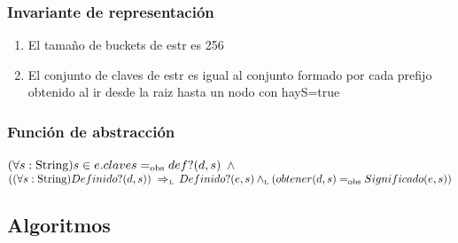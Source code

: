 
\subsubsection*{Invariante de representación}

\begin{enumerate}
\item El tamaño de buckets de estr es 256
\item El conjunto de claves de estr es igual al conjunto formado por cada prefijo obtenido al ir desde la raiz hasta un nodo con hayS=true
\end{enumerate}


\subsubsection*{Función de abstracción}
$(\paratodo{String}{s}) s \in e.claves \igobs def?(d,s)$ $\land$ \\
$((\paratodo{String}{s}) Definido?(d,s)) \impluego Definido?(e,s) \yluego (obtener(d,s) \igobs Significado(e,s))$
  


\subsection{Algoritmos}


